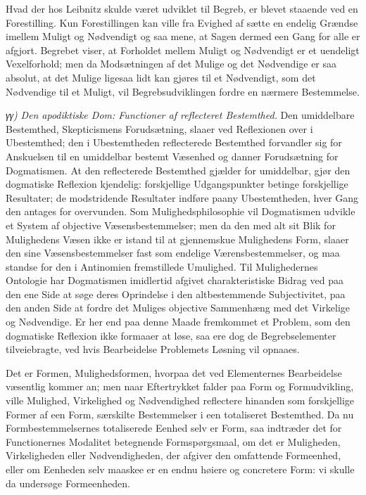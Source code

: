 \documentclass[12pt]{book}
\newcommand{\opage}[1]{\marginnote{\footnotesize\textit{[#1]}}}
\begin{document}
Hvad der hos Leibnitz skulde været udviklet til Begreb,
er blevet staaende ved en Forestilling. Kun Forestillingen kan
ville fra Evighed af sætte en endelig Grændse imellem Muligt
og Nødvendigt og saa mene, at Sagen dermed een Gang for
alle er afgjort. Begrebet viser, at Forholdet mellem Muligt
\opage{247}og Nødvendigt er et uendeligt Vexelforhold; men da Modsætningen
af det Mulige og det Nødvendige er saa absolut, at
det Mulige ligesaa lidt kan gjøres til et Nødvendigt, som det
Nødvendige til et Muligt, vil Begrebsudviklingen fordre en
nærmere Bestemmelse.

\textit{γγ)} \emph{Den apodiktiske Dom: Functioner af
reflecteret Bestemthed.} Den umiddelbare Bestemthed,
Skepticismens Forudsætning, slaaer ved Reflexionen over i
Ubestemthed; den i Ubestemtheden reflecterede Bestemthed forvandler
sig for Anskuelsen til en umiddelbar bestemt Væsenhed
og danner Forudsætning for Dogmatismen. At den reflecterede
Bestemthed gjælder for umiddelbar, gjør den dogmatiske
Reflexion kjendelig: forskjellige Udgangspunkter betinge
forskjellige Resultater; de modstridende Resultater indføre
paany Ubestemtheden, hver Gang den antages for overvunden.
Som Mulighedsphilosophie vil Dogmatismen udvikle et System
af objective Væsensbestemmelser; men da den med alt
sit Blik for Mulighedens Væsen ikke er istand til at gjennemskue
Mulighedens Form, slaaer den sine Væsensbestemmelser
fast som endelige Værensbestemmelser, og maa standse for den
i Antinomien fremstillede Umulighed. Til Mulighedernes Ontologie
har Dogmatismen imidlertid afgivet charakteristiske Bidrag
ved paa den ene Side at søge deres Oprindelse i den
altbestemmende Subjectivitet, paa den anden Side at fordre
det Muliges objective Sammenhæng med det Virkelige og
Nødvendige. Er her end paa denne Maade fremkommet et
Problem, som den dogmatiske Reflexion ikke formaaer at løse,
saa ere dog de Begrebselementer tilveiebragte, ved hvis Bearbeidelse
Problemets Løsning vil opnaaes.

Det er Formen, Mulighedsformen, hvorpaa det ved Elementernes
Bearbeidelse væsentlig kommer an; men naar Eftertrykket
falder paa Form og Formudvikling, ville Mulighed,
Virkelighed og Nødvendighed reflectere hinanden som forskjellige
Former af een Form, særskilte Bestemmelser i een totaliseret
\opage{248}Bestemthed. Da nu Formbestemmelsernes totaliserede Eenhed
selv er Form, saa indtræder det for Functionernes Modalitet
betegnende Formspørgsmaal, om det er Muligheden, Virkeligheden
eller Nødvendigheden, der afgiver den omfattende Formeenhed,
eller om Eenheden selv maaskee er en endnu høiere
og concretere Form: vi skulle da undersøge Formeenheden.
\end{document}
